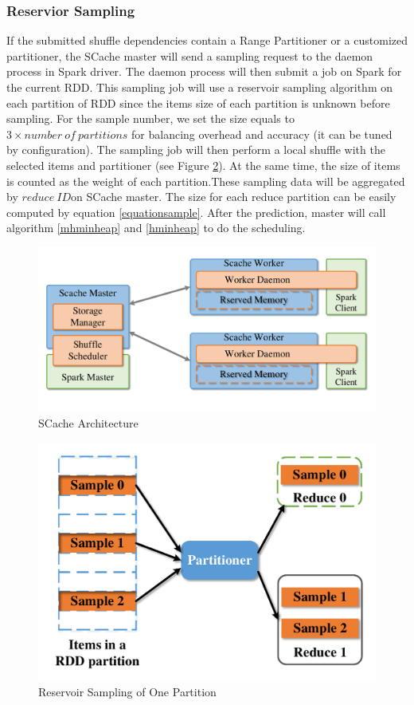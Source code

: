\subsubsection{Reservior Sampling}\label{sampling}
If the submitted shuffle dependencies contain a Range Partitioner or a customized partitioner, the SCache master will send a sampling request to the daemon process in Spark driver. The daemon process will then submit a job on Spark for the current RDD. This sampling job will use a reservoir sampling algorithm\cite{reservoir} on each partition of RDD since the items size of each partition is unknown before sampling. For the sample number, we set the size equals to $3 \times number\ of\ partitions$ for balancing overhead and accuracy (it can be tuned by configuration). The sampling job will then perform a local shuffle with the selected items and partitioner (see Figure \ref{fig:sample}). At the same time, the size of items is counted as the weight of each partition.These sampling data will be aggregated by $reduce\ ID$on SCache master. The size for each reduce partition can be easily computed by equation \ref{equationsample}. After the prediction, master will call algorithm \ref{mhminheap} and \ref{hminheap} to do the scheduling. 

\begin{figure}
	\centering
	\includegraphics[width=0.9\linewidth]{fig/arch}
	\caption{SCache Architecture}
	\label{fig:arch}
\end{figure}
\begin{figure}
	\centering
	\includegraphics[width=0.7\linewidth]{fig/sample}
	\caption{Reservoir Sampling of One Partition}
	\label{fig:sample}
\end{figure}

